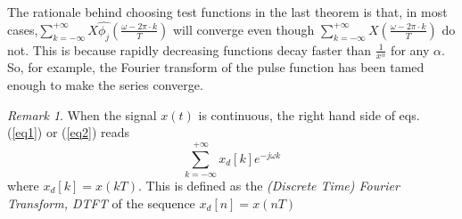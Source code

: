 \documentclass[12pt]{article}
\theoremstyle{definition}
\theoremstyle{remark}
\newtheorem{rem}{Remark}
\newcommand{\replica}[3]{\sum_{k=#2}^{#3} #1 \left(\frac{\omega- 2\pi \cdot k}{T}
\right)}
\begin{document}
\noindent The rationale behind choosing test functions in the last
theorem is that, in most
cases,$\replica{X\hat{\phi_j}}{-\infty}{+\infty}$ will converge even
though $\replica{X}{-\infty}{+\infty}$ do not. This is because
rapidly decreasing functions decay faster than $\frac{1}{x^\alpha}$
for any $\alpha$. So, for example, the Fourier transform of the
pulse function has been tamed enough to make the series converge.


\begin{rem}
When the signal $x(t)$ is continuous, the right hand side of eqs.
(\ref{eq1}) or (\ref{eq2}) reads $$ \sum_{k=-\infty}^{+\infty}
x_d[k] e^{-j\omega k}$$ where $x_d[k]=x(kT)$. This is defined as the
\emph{(Discrete Time) Fourier Transform, DTFT} of the sequence
${x_d[n]=x(nT)}$
\end{rem}

\end{document}
